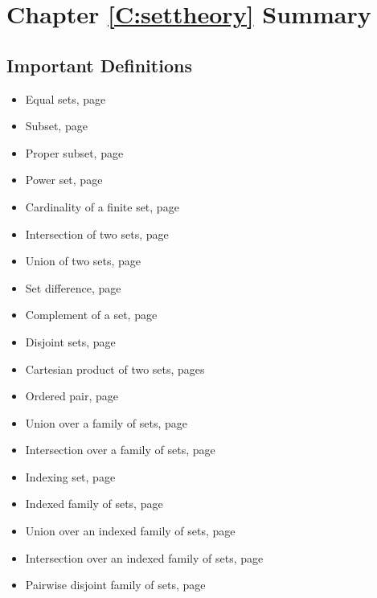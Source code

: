 \section{Chapter \ref{C:settheory} Summary}

\subsection*{Important Definitions}
\begin{multicols}{2}
\begin{itemize}
\item Equal sets, page~\pageref*{sym:setequal12}
\item Subset, page~\pageref*{sym:subset2}
\item Proper subset, page~\pageref*{sym:propersub}
\item Power set, page~\pageref*{D:powerset}
\item Cardinality of a finite set, page~\pageref*{D:cardinality}
\item Intersection of two sets, page~\pageref*{intersection}
\item Union of two sets, page~\pageref*{intersection}
\item Set difference, page~\pageref*{setdiff}
\item Complement of a set, page~\pageref*{setdiff}
\item Disjoint sets, page~\pageref*{D:disjointsets}
\item Cartesian product of two sets, pages~\pageref*{cartesianproduct}%
\item Ordered pair, page~\pageref*{orderedpair}
\item Union over a family of sets, page~\pageref*{D:familyoper}
\item Intersection over a family of sets, page~\pageref*{D:familyoper}
\item Indexing set, page~\pageref*{D:indexfamily}
\item Indexed family of sets, page~\pageref*{D:indexfamily}
\item Union over an indexed family of sets, page~\pageref*{D:indexoper}
\item Intersection over an indexed family of sets, page~\pageref*{D:indexoper}
\item Pairwise disjoint family of sets, page~\pageref*{D:disjointfamily}
\end{itemize}
\end{multicols}
\hbreak



